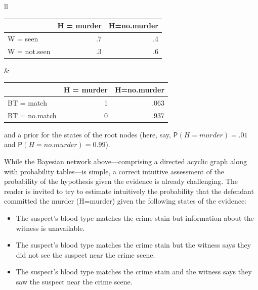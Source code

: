 \documentclass[11pt,dvipsnames,enabledeprecatedfontcommands]{scrartcl}
\newcommand{\pr}[1]{\mathsf{P}(#1)}
\begin{document}
\noindent

\begin{tabular}{ll}
\begin{minipage}[c]{0.45\linewidth}
\begin{table}[H]
\centering
\begin{tabular}{lrr}
\toprule
  & H = murder & H=no.murder\\
\midrule
W = seen & .7 & .4\\
W = not.seen & .3 & .6\\
\bottomrule
\end{tabular}
\end{table}
\end{minipage}& \begin{minipage}[c]{0.45\linewidth}
\begin{table}[H]
\centering
\begin{tabular}{lrr}
\toprule
  & H = murder & H=no.murder\\
\midrule
BT = match & 1 & .063\\
BT = no.match & 0 & .937\\
\bottomrule
\end{tabular}
\end{table}
\end{minipage}
\end{tabular}

\vspace{2mm}

\noindent and a prior for the states of the root nodes (here, say,
\(\pr{H=murder} = .01\) and \(\pr{H= no.murder} = 0.99\)).

While the Bayesian network above---comprising a directed acyclic graph
along with probability tables---is simple, a correct intuitive
assessment of the probability of the hypothesis given the evidence is
already challenging. The reader is invited to try to estimate
intuitively the probability that the defendant committed the murder
(H=murder) given the following states of the evidence:

\begin{itemize} 
\item The suspect's blood type matches the crime stain but  information about the witness is unavailable.
\item The suspect's blood type matches the crime stain but the witness says they did not see the suspect near the crime scene.
\item The suspect's blood type matches the crime stain and the witness says they saw the suspect near the crime scene.
\end{itemize}
\end{document}
